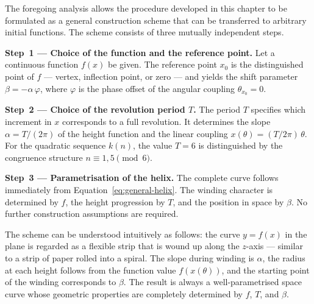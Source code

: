 The foregoing analysis allows the procedure developed in this chapter to
be formulated as a general construction scheme that can be transferred to
arbitrary initial functions. The scheme consists of three mutually
independent steps.

\textbf{Step~1 --- Choice of the function and the reference point.}
Let a continuous function $f(x)$ be given. The reference point $x_0$ is
the distinguished point of $f$ --- vertex, inflection point, or zero ---
and yields the shift parameter
$\beta = -\alpha\,\varphi$, where $\varphi$ is the phase offset of the
angular coupling $\theta_{x_0} = 0$.

\textbf{Step~2 --- Choice of the revolution period $T$.}
The period $T$ specifies which increment in $x$ corresponds to a full
revolution. It determines the slope $\alpha = T/(2\pi)$ of the height
function and the linear coupling
$x(\theta) = (T/2\pi)\,\theta$. For the quadratic sequence $k(n)$, the
value $T = 6$ is distinguished by the congruence structure
$n \equiv 1, 5 \pmod{6}$.

\textbf{Step~3 --- Parametrisation of the helix.}
The complete curve follows immediately from
Equation~\eqref{eq:general-helix}. The winding character is determined
by $f$, the height progression by $T$, and the position in space by
$\beta$. No further construction assumptions are required.

\begin{remark}\label{rem:geometric-intuition}
The scheme can be understood intuitively as follows: the curve $y = f(x)$
in the plane is regarded as a flexible strip that is wound up along the
$z$-axis --- similar to a strip of paper rolled into a spiral. The slope
during winding is $\alpha$, the radius at each height follows from the
function value $f(x(\theta))$, and the starting point of the winding
corresponds to $\beta$. The result is always a well-parametrised space
curve whose geometric properties are completely determined by $f$, $T$,
and $\beta$.
\end{remark}
